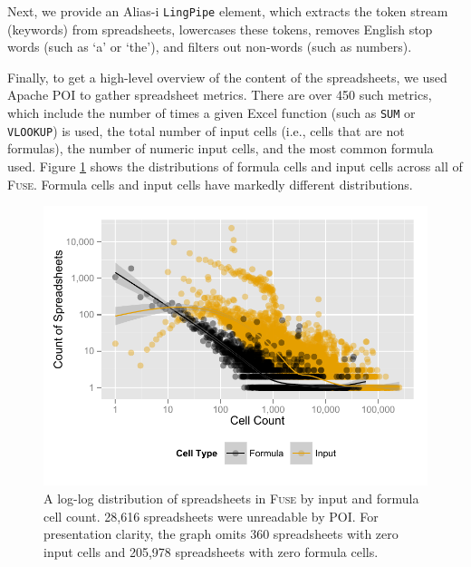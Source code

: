 \documentclass[conference]{IEEEtran}
\begin{document}
Next, we provide an Alias-i \texttt{LingPipe} element, which extracts the token stream (keywords) from spreadsheets, lowercases these tokens, removes English stop words (such as `a' or `the'), and filters out non-words (such as numbers).


Finally, to get a high-level overview of the content of the spreadsheets, we used Apache POI to gather spreadsheet metrics. There are over 450 such metrics, which include the number of times a given Excel function (such as \texttt{SUM} or \texttt{VLOOKUP}) is used, the total number of input cells (i.e., cells that are not formulas), the number of numeric input cells, and the most common formula used. 
%
Figure \ref{fig:corpus_overview} shows the distributions of formula cells
and input cells across all of \textsc{Fuse}. Formula cells and input cells have markedly different distributions.

\begin{figure}
\centering
\includegraphics[width=0.85\columnwidth]{figures/cellcount}
\caption{
A log-log distribution of spreadsheets in \textsc{Fuse} by input and formula cell count. 28,616 spreadsheets were unreadable by POI. For presentation clarity, the graph omits 360 spreadsheets with zero input cells and 205,978 spreadsheets with zero formula cells.    
\label{fig:corpus_overview}}
\end{figure}


\end{document}
